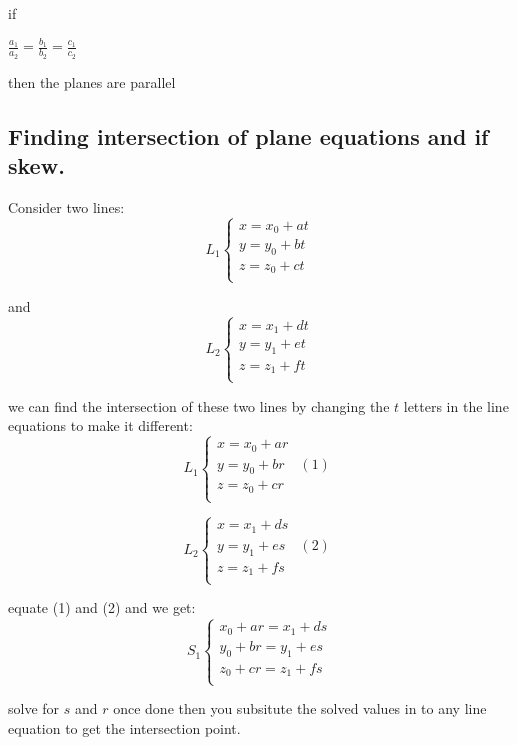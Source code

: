 if 
\begin{center}
    $\frac{a_1}{a_2} = \frac{b_1}{b_2} = \frac{c_1}{c_2}$\\
\end{center}

then the planes are parallel \\

\subsection{Finding intersection of plane equations and if skew.}
Consider two lines:
\[ L_1
\begin{cases} 
x = x_0 + at \\ 
y = y_0 + bt \\ 
z = z_0 + ct \\
\end{cases} 
\]

and
\[ L_2
\begin{cases}
x = x_1 + dt \\
y = y_1 + et \\
z = z_1 + ft \\
\end{cases}
\]

we can find the intersection of these two lines by changing the $t$ letters in the line equations to make it different:
\[ L_1
\begin{cases}
x = x_0 + ar \\
y = y_0 + br & (1)\\ 
z = z_0 + cr \\
\end{cases}
\]

\[ L_2
\begin{cases}
x = x_1 + ds \\
y = y_1 + es & (2)\\
z = z_1 + fs \\
\end{cases}
\]

equate (1) and (2) and we get: \\
\[ S_1
\begin{cases}
x_0 + ar = x_1 + ds \\ 
y_0 + br = y_1 + es \\ 
z_0 + cr = z_1 + fs \\
\end{cases}
\]

solve for $s$ and $r$ once done then you subsitute the solved values in to any line equation to get the intersection point.

